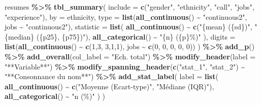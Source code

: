 \documentclass[
  11pt,
]{book}
\newenvironment{Shaded}{\begin{snugshade}}{\end{snugshade}}
\newcommand{\AttributeTok}[1]{\textcolor[rgb]{0.13,0.29,0.53}{#1}}
\newcommand{\DecValTok}[1]{\textcolor[rgb]{0.00,0.00,0.81}{#1}}
\newcommand{\FunctionTok}[1]{\textcolor[rgb]{0.13,0.29,0.53}{\textbf{#1}}}
\newcommand{\NormalTok}[1]{#1}
\newcommand{\SpecialCharTok}[1]{\textcolor[rgb]{0.81,0.36,0.00}{\textbf{#1}}}
\newcommand{\StringTok}[1]{\textcolor[rgb]{0.31,0.60,0.02}{#1}}
\numberwithin{equation}{section}
\numberwithin{countremarque}{section}
\begin{document}
\begin{Shaded}
\begin{Highlighting}[]
\NormalTok{resumes }\SpecialCharTok{\%\textgreater{}\%}
  \FunctionTok{tbl\_summary}\NormalTok{(}
    \AttributeTok{include =} \FunctionTok{c}\NormalTok{(}\StringTok{"gender"}\NormalTok{, }\StringTok{"ethnicity"}\NormalTok{, }\StringTok{"call"}\NormalTok{, }\StringTok{"jobs"}\NormalTok{, }\StringTok{"experience"}\NormalTok{),}
    \AttributeTok{by =}\NormalTok{ ethnicity,}
    \AttributeTok{type =} \FunctionTok{list}\NormalTok{(}\FunctionTok{all\_continuous}\NormalTok{() }\SpecialCharTok{\textasciitilde{}} \StringTok{"continuous2"}\NormalTok{,}
\NormalTok{                jobs }\SpecialCharTok{\textasciitilde{}} \StringTok{"continuous2"}\NormalTok{),}
    \AttributeTok{statistic =} \FunctionTok{list}\NormalTok{(}
      \FunctionTok{all\_continuous}\NormalTok{() }\SpecialCharTok{\textasciitilde{}} \FunctionTok{c}\NormalTok{(}\StringTok{"\{mean\} (\{sd\})"}\NormalTok{, }\StringTok{"\{median\} (\{p25\}, \{p75\})"}\NormalTok{),}
      \FunctionTok{all\_categorical}\NormalTok{() }\SpecialCharTok{\textasciitilde{}} \StringTok{"\{n\} (\{p\}\%)"}
\NormalTok{      ),}
    \AttributeTok{digits =} \FunctionTok{list}\NormalTok{(}\FunctionTok{all\_continuous}\NormalTok{() }\SpecialCharTok{\textasciitilde{}} \FunctionTok{c}\NormalTok{(}\DecValTok{1}\NormalTok{,}\DecValTok{3}\NormalTok{, }\DecValTok{3}\NormalTok{,}\DecValTok{1}\NormalTok{,}\DecValTok{1}\NormalTok{),}
\NormalTok{                  jobs }\SpecialCharTok{\textasciitilde{}} \FunctionTok{c}\NormalTok{(}\DecValTok{0}\NormalTok{, }\DecValTok{0}\NormalTok{, }\DecValTok{0}\NormalTok{, }\DecValTok{0}\NormalTok{, }\DecValTok{0}\NormalTok{))}
\NormalTok{    ) }\SpecialCharTok{\%\textgreater{}\%} 
  \FunctionTok{add\_p}\NormalTok{() }\SpecialCharTok{\%\textgreater{}\%} 
  \FunctionTok{add\_overall}\NormalTok{(}\AttributeTok{col\_label =} \StringTok{"Ech. total"}\NormalTok{) }\SpecialCharTok{\%\textgreater{}\%} 
  \FunctionTok{modify\_header}\NormalTok{(}\AttributeTok{label =} \StringTok{"**Variable**"}\NormalTok{) }\SpecialCharTok{\%\textgreater{}\%} 
  \FunctionTok{modify\_spanning\_header}\NormalTok{(}\FunctionTok{c}\NormalTok{(}\StringTok{"stat\_1"}\NormalTok{, }\StringTok{"stat\_2"}\NormalTok{) }\SpecialCharTok{\textasciitilde{}} \StringTok{"**Consonnance du nom**"}\NormalTok{) }\SpecialCharTok{\%\textgreater{}\%} 
  \FunctionTok{add\_stat\_label}\NormalTok{(}
    \AttributeTok{label =} \FunctionTok{list}\NormalTok{(}
      \FunctionTok{all\_continuous}\NormalTok{() }\SpecialCharTok{\textasciitilde{}} \FunctionTok{c}\NormalTok{(}\StringTok{"Moyenne (Ecart{-}type)"}\NormalTok{, }\StringTok{"Médiane (IQR)"}\NormalTok{),}
      \FunctionTok{all\_categorical}\NormalTok{() }\SpecialCharTok{\textasciitilde{}} \StringTok{"n (\%)"}
\NormalTok{    )}
\NormalTok{  )}
\end{Highlighting}
\end{Shaded}
\end{document}
